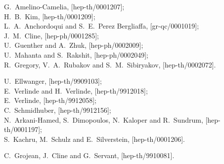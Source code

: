 \documentclass[a4paper,12pt]{article}
\begin{document}
\begin{thebibliography}{99}
%
G.~Amelino-Camelia,
[hep-th/0001207];\\
%
H.~B.~Kim,
[hep-th/0001209];\\
%
L.~A.~Anchordoqui and S.~E.~Perez Bergliaffa,
[gr-qc/0001019];\\
%
J.~M.~Cline,
[hep-ph/0001285];\\
%
U.~Guenther and A.~Zhuk,
[hep-ph/0002009];\\
%
U.~Mahanta and S.~Rakshit,
[hep-ph/0002049];\\
%
R.~Gregory, V.~A.~Rubakov and S.~M.~Sibiryakov,
[hep-th/0002072].






U.~Ellwanger,
[hep-th/9909103];\\
%
E.~Verlinde and H.~Verlinde,
[hep-th/9912018];\\
%
E.~Verlinde,
[hep-th/9912058];\\
%
C.~Schmidhuber,
[hep-th/9912156];\\
%
N.~Arkani-Hamed, S.~Dimopoulos, N.~Kaloper and R.~Sundrum,
[hep-th/0001197];\\
%
S.~Kachru, M.~Schulz and E.~Silverstein,
[hep-th/0001206].

C.~Grojean, J.~Cline and G.~Servant,
[hep-th/9910081].






\end{thebibliography}
\end{document}
